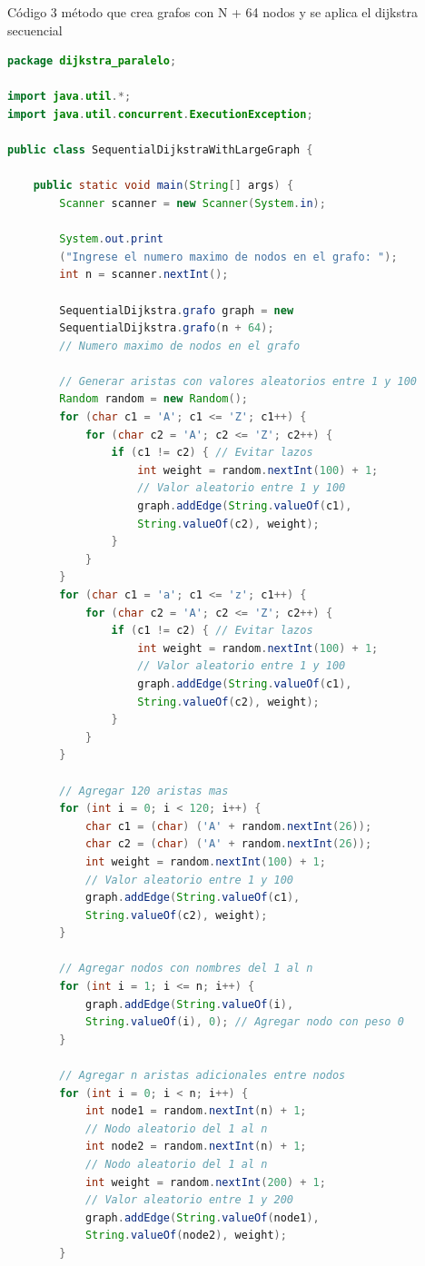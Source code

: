 Código 3 método que crea grafos con N + 64 nodos y se aplica  el dijkstra secuencial
\begin{lstlisting}[language=Java, style=ColorStyle]
package dijkstra_paralelo;

import java.util.*;
import java.util.concurrent.ExecutionException;

public class SequentialDijkstraWithLargeGraph {

    public static void main(String[] args) {
        Scanner scanner = new Scanner(System.in);

        System.out.print
        ("Ingrese el numero maximo de nodos en el grafo: ");
        int n = scanner.nextInt();

        SequentialDijkstra.grafo graph = new
        SequentialDijkstra.grafo(n + 64); 
        // Numero maximo de nodos en el grafo

        // Generar aristas con valores aleatorios entre 1 y 100
        Random random = new Random();
        for (char c1 = 'A'; c1 <= 'Z'; c1++) {
            for (char c2 = 'A'; c2 <= 'Z'; c2++) {
                if (c1 != c2) { // Evitar lazos
                    int weight = random.nextInt(100) + 1; 
                    // Valor aleatorio entre 1 y 100
                    graph.addEdge(String.valueOf(c1),
                    String.valueOf(c2), weight);
                }
            }
        }
        for (char c1 = 'a'; c1 <= 'z'; c1++) {
            for (char c2 = 'A'; c2 <= 'Z'; c2++) {
                if (c1 != c2) { // Evitar lazos
                    int weight = random.nextInt(100) + 1; 
                    // Valor aleatorio entre 1 y 100
                    graph.addEdge(String.valueOf(c1), 
                    String.valueOf(c2), weight);
                }
            }
        }

        // Agregar 120 aristas mas
        for (int i = 0; i < 120; i++) {
            char c1 = (char) ('A' + random.nextInt(26));
            char c2 = (char) ('A' + random.nextInt(26));
            int weight = random.nextInt(100) + 1;
            // Valor aleatorio entre 1 y 100
            graph.addEdge(String.valueOf(c1), 
            String.valueOf(c2), weight);
        }

        // Agregar nodos con nombres del 1 al n
        for (int i = 1; i <= n; i++) {
            graph.addEdge(String.valueOf(i), 
            String.valueOf(i), 0); // Agregar nodo con peso 0
        }

        // Agregar n aristas adicionales entre nodos
        for (int i = 0; i < n; i++) {
            int node1 = random.nextInt(n) + 1; 
            // Nodo aleatorio del 1 al n
            int node2 = random.nextInt(n) + 1; 
            // Nodo aleatorio del 1 al n
            int weight = random.nextInt(200) + 1; 
            // Valor aleatorio entre 1 y 200
            graph.addEdge(String.valueOf(node1), 
            String.valueOf(node2), weight);
        }


\end{lstlisting}
